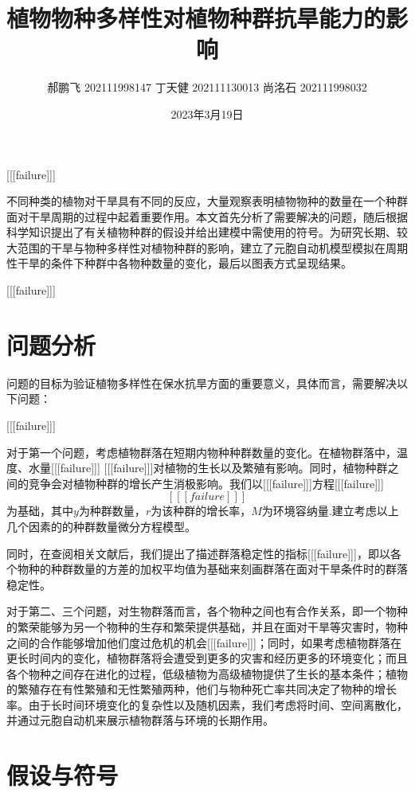 \documentclass{article}
\title{植物物种多样性对植物种群抗旱能力的影响}
\author{郝鹏飞 202111998147 丁天健 202111130013 尚{\CJKfontspec{宋体-简}洺}石 202111998032 }
\date{2023年3月19日}
\begin{document}
\maketitle{}






[[[failure]]]

不同种类的植物对干旱具有不同的反应，大量观察表明植物物种的数量在一个种群面对干旱周期的过程中起着重要作用。本文首先分析了需要解决的问题，随后根据科学知识提出了有关植物种群的假设并给出建模中需使用的符号。为研究长期、较大范围的干旱与物种多样性对植物种群的影响，建立了元胞自动机模型模拟在周期性干旱的条件下种群中各物种数量的变化，最后以图表方式呈现结果。

[[[failure]]]

\section{问题分析}


问题的目标为验证植物多样性在保水抗旱方面的重要意义，具体而言，需要解决以下问题：

[[[failure]]]

对于第一个问题，考虑植物群落在短期内物种种群数量的变化。在植物群落中，温度、水量[[[failure]]] [[[failure]]]对植物的生长以及繁殖有影响。同时，植物种群之间的竞争会对植物种群的增长产生消极影响。我们以[[[failure]]]方程[[[failure]]] \[[[[failure]]]\] 为基础，其中$y$为种群数量，$r$为该种群的增长率，$M$为环境容纳量.建立考虑以上几个因素的的种群数量微分方程模型。

同时，在查阅相关文献后，我们提出了描述群落稳定性的指标[[[failure]]]，即以各个物种的种群数量的方差的加权平均值为基础来刻画群落在面对干旱条件时的群落稳定性。

对于第二、三个问题，对生物群落而言，各个物种之间也有合作关系，即一个物种的繁荣能够为另一个物种的生存和繁荣提供基础，并且在面对干旱等灾害时，物种之间的合作能够增加他们度过危机的机会[[[failure]]]；同时，如果考虑植物群落在更长时间内的变化，植物群落将会遭受到更多的灾害和经历更多的环境变化；而且各个物种之间存在进化的过程，低级植物为高级植物提供了生长的基本条件；植物的繁殖存在有性繁殖和无性繁殖两种，他们与物种死亡率共同决定了物种的增长率。由于长时间环境变化的复杂性以及随机因素，我们考虑将时间、空间离散化，并通过元胞自动机来展示植物群落与环境的长期作用。

\section{假设与符号}
\end{document}
